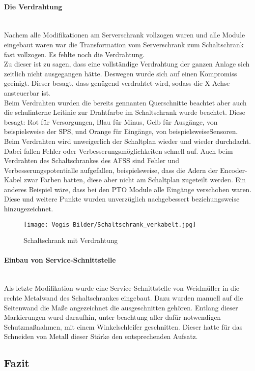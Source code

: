     \paragraph{Die Verdrahtung}\mbox{}\\
    Nachem alle Modifikationen am Serverschrank vollzogen waren und alle Module eingebaut waren war die Transformation vom Serverschrank zum Schaltschrank fast vollzogen. Es fehlte noch die Verdrahtung.\\
    Zu dieser ist zu sagen, dass eine vollständige Verdrahtung der ganzen Anlage sich zeitlich nicht ausgegangen hätte. Deswegen wurde sich auf einen Kompromiss geeinigt. Dieser besagt, dass genügend verdrahtet wird, sodass die X-Achse ansteuerbar ist.\\
    Beim Verdrahten wurden die bereits gennanten Querschnitte beachtet aber auch die schulinterne Leitinie zur Drahtfarbe im Schaltschrank wurde beachtet. Diese besagt: Rot für Versorgungen, Blau für Minus, Gelb für Ausgänge, von beispielsweise der SPS, und Orange für Eingänge, von  beispielsweiseSensoren.\\
    Beim Verdrahten wird unweigerlich der Schaltplan wieder und wieder durchdacht. Dabei fallen Fehler oder Verbesserungsmöglichkeiten schnell auf. Auch beim Verdrahten des Schaltschrankes des AFSS sind Fehler und Verbesserungspotentialle aufgefallen, beispielsweise, dass die Adern der Encoder-Kabel zwar Farben hatten, diese aber nicht am Schaltplan zugeteilt werden. Ein anderes Beispiel wäre, dass bei den PTO Module alle Eingänge verschoben waren. Diese und weitere Punkte wurden unverzüglich nachgebessert beziehungsweise hinzugezeichnet.\\
    \begin{figure}[h]
        \centering
        \texttt{[image: Vogis Bilder/Schaltschrank\_verkabelt.jpg]}
        \caption{Schaltschrank mit Verdrahtung}
        \label{fig:Schaltschrank_verkabelt}
    \end{figure}
    \paragraph{Einbau von Service-Schnittstelle}\mbox{}\\ 
    Als letzte Modifikation wurde eine Service-Schnittstelle von Weidmüller in die rechte Metalwand des Schaltschrankes eingebaut. Dazu wurden manuell auf die Seitenwand die Maße angezeichnet die ausgeschnitten gehören. Entlang dieser Markierungen wurd daraufhin, unter beachtung aller dafür notwendigen Schutzmaßnahmen, mit einem Winkelschleifer geschnitten. Dieser hatte für das Schneiden von Metall dieser Stärke den entsprechenden Aufsatz. 
\subsection{Fazit}\mbox{}\\





